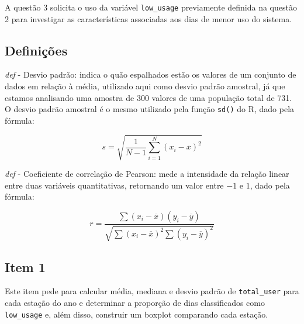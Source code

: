
A questão 3 solicita o uso da variável \texttt{low\_usage} previamente definida na questão 2 para investigar as características associadas aos dias de menor uso do sistema.


\subsection*{Definições}
\noindent \textit{def} - Desvio padrão: indica o quão espalhados estão os valores de um conjunto de dados em relação à média, utilizado aqui como desvio padrão amostral, já que estamos analisando uma amostra de 300 valores de uma população total de 731. O desvio padrão amostral é o mesmo utilizado pela função \texttt{sd()} do R, dado pela fórmula:

\begin{equation*}
    s = \sqrt{\frac{1}{N-1}\sum_{i=1}^{N}\left(x_i-\overline{x}\right)^2}
\end{equation*}

\noindent \textit{def} - Coeficiente de correlação de Pearson: mede a intensidade da relação linear entre duas variáveis quantitativas, retornando um valor entre $-1$ e $1$, dado pela fórmula:

\begin{equation*}
    r = \frac{\sum\left(x_i-\overline{x}\right)\left(y_i-\overline{y}\right)}{\sqrt{\sum\left(x_i-\overline{x}\right)^2\sum\left(y_i-\overline{y}\right)^2}}
\end{equation*}


\subsection*{Item 1}
Este item pede para calcular média, mediana e desvio padrão de \texttt{total\_user} para cada estação do ano e determinar a proporção de dias classificados como \texttt{low\_usage} e, além disso, construir um boxplot comparando cada estação.

